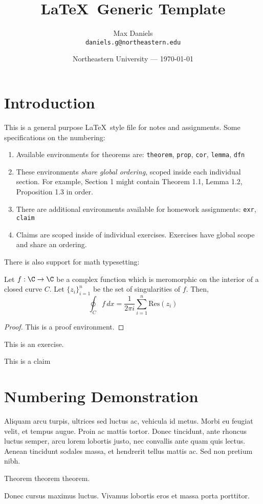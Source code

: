 \documentclass{article}
\title{\LaTeX~Generic Template}
\author{Max Daniels\\ \texttt{daniels.g@northeastern.edu}}
\date{Northeastern University --- \today}
\begin{document}
\maketitle 


\section*{Introduction}
This is a general purpose \LaTeX~style file for notes and assignments. Some specifications on the numbering:
\begin{enumerate}
    \item Available environments for theorems are: \texttt{theorem}, \texttt{prop}, \texttt{cor}, \texttt{lemma}, \texttt{dfn}
    \item These environments \textit{share global ordering}, scoped inside each individual section. For example, Section 1 might contain Theorem 1.1, Lemma 1.2, Proposition 1.3 in order. 
    \item There are additional environments available for homework assignments: \texttt{exr}, \texttt{claim}
    \item Claims are scoped inside of individual exercises. Exercises have global scope and share an ordering.
\end{enumerate}
There is also support for math typesetting:
\begin{theorem}
Let $f: \C \to \C$ be a complex function which is meromorphic on the interior of a closed curve $C$. Let $\{z_i\}_{i=1}^n$ be the set of singularities of $f$. Then,
\begin{equation*}
    \oint_{C} f \, dx = \frac{1}{2\pi i} \sum_{i=1}^n \text{Res}(z_i)
\end{equation*}
\end{theorem}
\begin{proof}
This is a proof environment.
\end{proof}

\begin{exr}[Given]
This is an exercise.
    \begin{claim}
    This is a claim
    \end{claim}
\end{exr}

\section{Numbering Demonstration}
Aliquam arcu turpis, ultrices sed luctus ac, vehicula id metus. Morbi eu feugiat velit, et tempus augue. Proin ac mattis tortor. Donec tincidunt, ante rhoncus luctus semper, arcu lorem lobortis justo, nec convallis ante quam quis lectus. Aenean tincidunt sodales massa, et hendrerit tellus mattis ac. Sed non pretium nibh.
\begin{theorem}
Theorem theorem theorem.
\end{theorem}
Donec cursus maximus luctus. Vivamus lobortis eros et massa porta porttitor.
\end{document}

